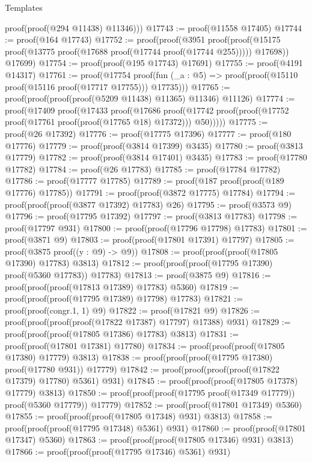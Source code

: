 \begin{lexlean}{Templates}
\begin{coremodule}
          proof(proof(@294 @11438) @11346)))
@17743 := proof(@11558 @17405)
@17744 := proof(@164 @17743)
@17752 := proof(proof(@3951
        proof(proof(@15175 proof(@13775 proof(@17688 proof(@17744 proof(@17744 @255))))) @17698))
      @17699)
@17754 := proof(proof(@195 @17743) @17691)
@17755 := proof(@4191 @14317)
@17761 := proof(@17754
      proof(fun (_a : @5) => proof(proof(@15110 proof(@15116 proof(@17717 @17755))) @17735)))
@17765 := proof(proof(proof(proof(@5209 @11438) @11365) @11346) @11126)
@17774 := proof(@17409
      proof(@17433
          proof(@17686
              proof(@17742
                  proof(proof(@17752 proof(@17761 proof(proof(@17765 @18) @17372))) @50)))))
@17775 := proof(@26 @17392)
@17776 := proof(@17775 @17396)
@17777 := proof(@180 @17776)
@17779 := proof(proof(@3814 @17399) @3435)
@17780 := proof(@3813 @17779)
@17782 := proof(proof(@3814 @17401) @3435)
@17783 := proof(@17780 @17782)
@17784 := proof(@26 @17783)
@17785 := proof(@17784 @17782)
@17786 := proof(@17777 @17785)
@17789 := proof(@187 proof(proof(@189 @17776) @17785))
@17791 := proof(proof(@3872 @17775) @17784)
@17794 := proof(proof(proof(@3877 @17392) @17783) @26)
@17795 := proof(@3573 @9)
@17796 := proof(@17795 @17392)
@17797 := proof(@3813 @17783)
@17798 := proof(@17797 @931)
@17800 := proof(proof(@17796 @17798) @17783)
@17801 := proof(@3871 @9)
@17803 := proof(proof(@17801 @17391) @17797)
@17805 := proof(@3875 proof((y : @9) -> @9))
@17808 := proof(proof(proof(@17805 @17390) @17783) @3813)
@17812 := proof(proof(proof(@17795 @17390) proof(@5360 @17783)) @17783)
@17813 := proof(@3875 @9)
@17816 := proof(proof(proof(@17813 @17389) @17783) @5360)
@17819 := proof(proof(proof(@17795 @17389) @17798) @17783)
@17821 := proof(proof(congr.{1, 1}) @9)
@17822 := proof(@17821 @9)
@17826 := proof(proof(proof(proof(@17822 @17387) @17797) @17388) @931)
@17829 := proof(proof(proof(@17805 @17386) @17783) @3813)
@17831 := proof(proof(@17801 @17381) @17780)
@17834 := proof(proof(proof(@17805 @17380) @17779) @3813)
@17838 := proof(proof(proof(@17795 @17380) proof(@17780 @931)) @17779)
@17842 := proof(proof(proof(proof(@17822 @17379) @17780) @5361) @931)
@17845 := proof(proof(proof(@17805 @17378) @17779) @3813)
@17850 := proof(proof(proof(@17795 proof(@17349 @17779)) proof(@5360 @17779)) @17779)
@17852 := proof(proof(@17801 @17349) @5360)
@17855 := proof(proof(proof(@17805 @17348) @931) @3813)
@17858 := proof(proof(proof(@17795 @17348) @5361) @931)
@17860 := proof(proof(@17801 @17347) @5360)
@17863 := proof(proof(proof(@17805 @17346) @931) @3813)
@17866 := proof(proof(proof(@17795 @17346) @5361) @931)

\end{coremodule}
\end{lexlean}
